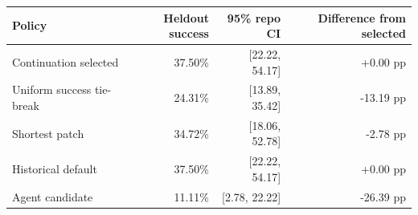 \begin{tabular}{@{}lrrr@{}}
\toprule
Policy & Heldout success & 95\% repo CI & Difference from selected \\
\midrule
Continuation selected & 37.50\% & [22.22, 54.17] & +0.00 pp \\
Uniform success tie-break & 24.31\% & [13.89, 35.42] & -13.19 pp \\
Shortest patch & 34.72\% & [18.06, 52.78] & -2.78 pp \\
Historical default & 37.50\% & [22.22, 54.17] & +0.00 pp \\
Agent candidate & 11.11\% & [2.78, 22.22] & -26.39 pp \\
\bottomrule
\end{tabular}

